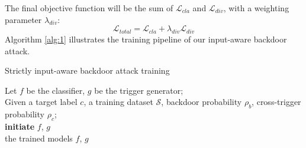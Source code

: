 The final objective function will be the sum of $\mathcal{L}_{cla}$ and $\mathcal{L}_{div}$, with a weighting parameter $\lambda_{div}$:
\begin{equation*}
    \mathcal{L}_{total} = \mathcal{L}_{cla} + \lambda_{div}\mathcal{L}_{div}
\end{equation*}
Algorithm \ref{alg:1} illustrates the training pipeline of our input-aware backdoor attack.
\begin{algorithm}[t]
\small
  \SetAlgoLined
  \caption{Strictly input-aware backdoor attack training}
  \label{alg:1}
  Let $f$ be the classifier, $g$ be the trigger generator;\\
  Given a target label $c$,  a training dataset $\mathcal{S}$, backdoor probability $\rho_b$, cross-trigger probability $\rho_c$;\\
  \textbf{initiate} $f$, $g$ \\
  \Return the trained models $f$, $g$
\end{algorithm}

